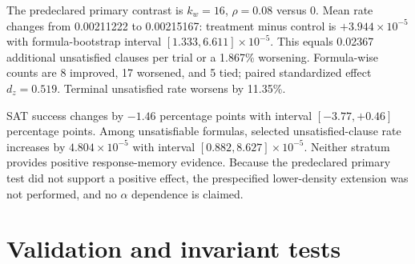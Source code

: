\documentclass[aps,prapplied,preprint,superscriptaddress,longbibliography,floatfix]{revtex4-2}
\begin{document}
The predeclared primary contrast is $k_w=16$, $\rho=0.08$ versus 0.  Mean rate changes from 0.00211222 to 0.00215167: treatment minus control is $+3.944\times10^{-5}$ with formula-bootstrap interval $[1.333,6.611]\times10^{-5}$.  This equals 0.02367 additional unsatisfied clauses per trial or a 1.867\% worsening.  Formula-wise counts are 8 improved, 17 worsened, and 5 tied; paired standardized effect $d_z=0.519$.  Terminal unsatisfied rate worsens by 11.35\%.

SAT success changes by $-1.46$ percentage points with interval $[-3.77,+0.46]$ percentage points.  Among unsatisfiable formulas, selected unsatisfied-clause rate increases by $4.804\times10^{-5}$ with interval $[0.882,8.627]\times10^{-5}$.  Neither stratum provides positive response-memory evidence.  Because the predeclared primary test did not support a positive effect, the prespecified lower-density extension was not performed, and no $\alpha$ dependence is claimed.

\section{Validation and invariant tests}
\label{secS:validation}
\end{document}
